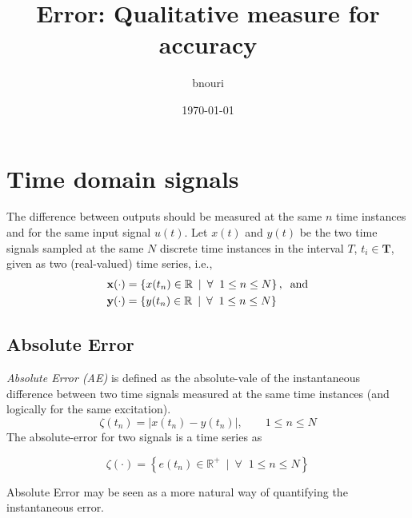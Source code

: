 \documentclass[10pt,oneside]{article}
\title{Error: Qualitative measure for accuracy}
\author{bnouri}
\date{\small \today}
\begin{document}

\section{Time domain signals} 
The difference between outputs should be measured at the same $n$ time instances and for the same input signal $u(t)$. 
Let $x(t)$ and $y(t)$ be the two time signals sampled at the same $N$ discrete time instances in the interval $T$, $t_i \in  \mathbf{T}$, given as two (real-valued) time series, i.e.,
\begin{align}\label{eq:sig-1}
\mathbf{x}(\cdot)&=\left\{x(t_n) \in \mathbb{R} \:\mid \: \forall\;\;1 \leq n \leq N \right\}, \;\;\text{and} \\
\mathbf{y}(\cdot)&=\left\{y(t_n) \in \mathbb{R} \:\mid \: \forall\;\;1 \leq n \leq N \right\}
\end{align}

\subsection{Absolute Error}
\emph{Absolute Error (AE)} is defined as the absolute-vale of the instantaneous difference between two time signals measured at the same time instances (and logically for the same excitation). 
\begin{equation}\label{eq:ae-1}
\zeta(t_n)= |x(t_n) - y(t_n)|, \qquad 1 \leq n \leq N 
\end{equation}
The absolute-error for two signals is a time series as 

\begin{equation}\label{eq:ae-2}
\zeta(\cdot)=\left\{e(t_n) \in \mathbb{R}^+ \:\mid \: \forall\;\;1 \leq n \leq N \right\}
\end{equation}

\noindent Absolute Error may be seen as a more natural way of quantifying the instantaneous error.
\end{document}
